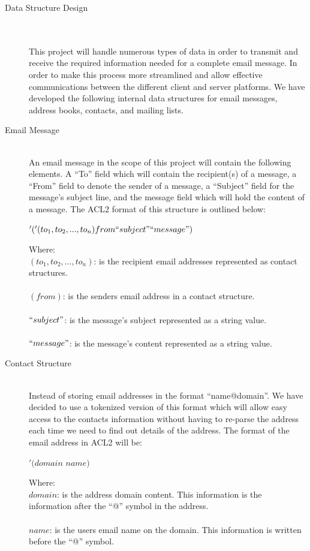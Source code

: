 \documentclass[11pt, letterpaper]{report}
\begin{document}
\begin{description}
\newpage
\item[\Large Data Structure Design] \hfill \\ \hfill \\
This project will handle numerous types of data in order to transmit and receive the required information needed for a complete email message. In order to make this process more streamlined and allow effective communications between the different client and server platforms. We have developed the following internal data structures for email messages, address books, contacts, and mailing lists. 
\item[Email Message] \hfill \\
An email message in the scope of this project will contain the following elements. A ``To'' field which will contain the recipient(s) of a message, a ``From'' field to denote the sender of a message, a ``Subject'' field for the message's subject line, and the message field which will hold the content of a message. The ACL2 format of this structure is outlined below: 
\begin{center} $'('(to_1, to_2, ..., to_n) from ``subject" ``message")$\end{center}
Where:\\
$(to_1, to_2, ..., to_n)$: is the recipient email addresses represented as contact structures. \\ \\
$(from)$: is the senders email address in a contact structure. \\  \\
$``subject"$: is the message's subject represented as a string value.\\ \\
$``message"$: is the message's content represented as a string value.

\item[Contact Structure]\hfill \\
Instead of storing email addresses in the format ``name@domain''. We have decided to use a tokenized version of this format which will allow easy access to the contacts information without having to re-parse the address each time we need to find out details of the address. The format of the email address in ACL2 will be: 
\begin{center} $'(domain$ $name)$ \end{center}
Where: \\
$domain$: is the address domain content. This information is the information after the ``@'' symbol in the address. \\ \\
$name$: is the users email name on the domain. This information is written before the ``@'' symbol.


\end{description}
\end{document}
